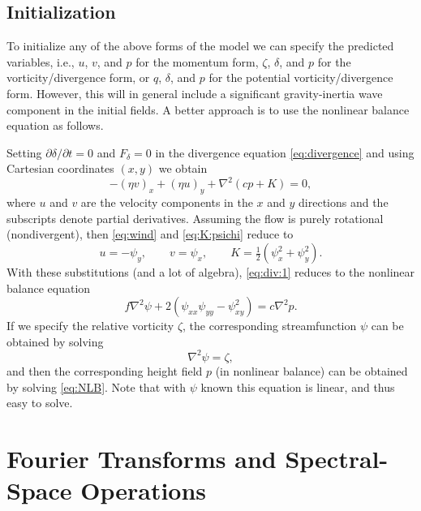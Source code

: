 \documentclass[12pt]{article}
\newcommand{\Fdelta}{F_{\delta}}
\newcommand{\p}{{p}}   %
\newcommand{\PV}{q}    %
\newcommand{\del}{\nabla}
\newcommand{\laplacian}[1]{\del^2#1}
\begin{document}
\pagebreak[2]
\subsection{Initialization\label{sec:initialization}}

To initialize any of the above forms of the model we can specify the predicted
variables, i.e., $u$, $v$, and $p$ for the momentum form, 
$\zeta$, $\delta$, and $p$ for the vorticity/divergence form, or
$\PV$, $\delta$, and $p$ for the potential vorticity/divergence form.
However, this will in general include a significant gravity-inertia wave
component in the initial fields.  A better approach is to use the nonlinear
balance equation as follows.

Setting $\partial\delta/\partial t=0$ and $\Fdelta=0$ in the divergence
equation \eqref{eq:divergence} and using Cartesian coordinates $(x,y)$ we
obtain
\begin{equation}
   - (\eta v)_x + (\eta u)_y + \del^2 \left(c\p + K\right) = 0 ,
\label{eq:div:1}
\end{equation}
where $u$ and $v$ are the velocity components in the $x$ and $y$ directions
and the subscripts denote partial derivatives.
Assuming the flow is purely rotational (nondivergent), then \eqref{eq:wind}
and \eqref{eq:K:psichi} reduce to
\begin{equation}
   u = -\psi_y,
\qquad
   v =  \psi_x,
\qquad
   K = \tfrac12\left( \psi_x^2 + \psi_y^2 \right).
\label{eq:wind:K:nondivergent}
\end{equation}
With these substitutions (and a lot of algebra), \eqref{eq:div:1} reduces to
the nonlinear balance equation
\begin{equation}
   f\laplacian\psi + 2\left(\psi_{xx}\psi_{yy} - \psi_{xy}^2 \right)
   = c\laplacian{p}.
\label{eq:NLB}
\end{equation}
If we specify the relative vorticity $\zeta$, the corresponding streamfunction
$\psi$ can be obtained by solving
\begin{equation}
   \laplacian\psi = \zeta,
\label{eq:psi:zeta}
\end{equation}
and then the corresponding height field $p$ (in nonlinear balance) can be
obtained by solving \eqref{eq:NLB}.  Note that with $\psi$ known this equation
is linear, and thus easy to solve.

\pagebreak[4]
\section{Fourier Transforms and Spectral-Space Operations\label{sec:Fourier}}
\setcounter{equation}{0}
\end{document}
